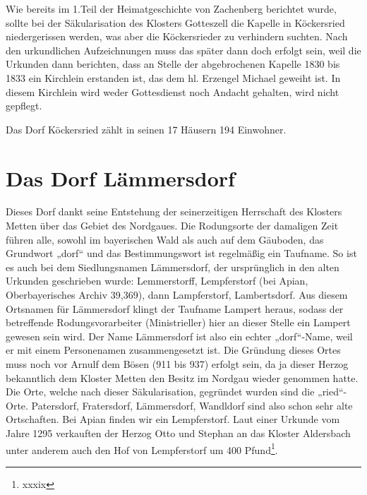 \documentclass{book}
\begin{document}
Wie bereits im 1.Teil der Heimatgeschichte von Zachenberg berichtet
wurde, sollte bei der Säkularisation des Klosters Gotteszell die Kapelle
in Köckersried niedergerissen werden, was aber die Köckersrieder zu
verhindern suchten. Nach den urkundlichen Aufzeichnungen muss das später
dann doch erfolgt sein, weil die Urkunden dann berichten, dass an Stelle
der abgebrochenen Kapelle 1830 bis 1833 ein Kirchlein erstanden ist, das
dem hl. Erzengel Michael geweiht ist. In diesem Kirchlein wird weder
Gottesdienst noch Andacht gehalten, wird nicht gepflegt.

Das Dorf Köckersried zählt in seinen 17 Häusern 194 Einwohner.

\section{Das Dorf Lämmersdorf}

Dieses Dorf dankt seine Entstehung der seinerzeitigen Herrschaft des
Klosters Metten über das Gebiet des Nordgaues. Die Rodungsorte der
damaligen Zeit führen alle, sowohl im bayerischen Wald als auch auf dem
Gäuboden, das Grundwort „dorf“ und das Bestimmungswort ist regelmäßig
ein Taufname. So ist es auch bei dem Siedlungsnamen Lämmersdorf, der
ursprünglich in den alten Urkunden geschrieben wurde: Lemmerstorff,
Lempferstorf (bei Apian, Oberbayerisches Archiv 39,369), dann
Lampferstorf, Lambertsdorf. Aus diesem Ortsnamen für Lämmersdorf klingt
der Taufname Lampert heraus, sodass der betreffende Rodungsvorarbeiter
(Ministrieller) hier an dieser Stelle ein Lampert gewesen sein wird. Der
Name Lämmersdorf ist also ein echter „dorf“-Name, weil er mit einem
Personenamen zusammengesetzt ist. Die Gründung dieses Ortes muss noch
vor Arnulf dem Bösen (911 bis 937) erfolgt sein, da ja dieser Herzog
bekanntlich dem Kloster Metten den Besitz im Nordgau wieder genommen
hatte. Die Orte, welche nach dieser Säkularisation, gegründet wurden
sind die „ried“-Orte. Patersdorf, Fratersdorf, Lämmersdorf, Wandldorf
sind also schon sehr alte Ortschaften. Bei Apian finden wir ein
Lempferstorf. Laut einer Urkunde vom Jahre 1295 verkauften der Herzog
Otto und Stephan an das Kloster Aldersbach unter anderem auch den Hof
von Lempferstorf um 400 Pfund\footnote{xxxix}.
\end{document}
